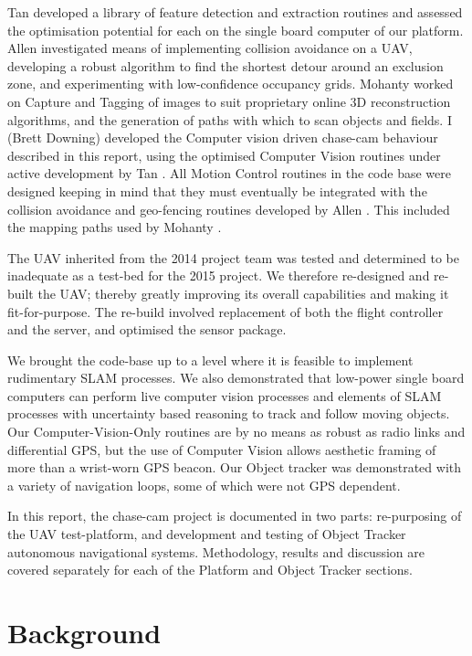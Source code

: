 \documentclass{article}
\begin{document}
    Tan \cite{Tan} developed a library of feature detection and extraction routines and assessed the optimisation potential for each on the single board computer of our platform.
    Allen \cite{Allen} investigated means of implementing collision avoidance on a UAV, developing a robust algorithm to find the shortest detour around an exclusion zone, and experimenting with low-confidence occupancy grids. 
    Mohanty \cite{Mohanty} worked on Capture and Tagging of images to suit proprietary online 3D reconstruction algorithms, and the generation of paths with which to scan objects and fields.
    I (Brett Downing) \cite{Downing} developed the Computer vision driven chase-cam behaviour described in this report, using the optimised Computer Vision routines under active development by Tan \cite{Tan}.
    All Motion Control routines in the code base were designed keeping in mind that they must eventually be integrated with the collision avoidance and geo-fencing routines developed by Allen \cite{Allen}. This included the mapping paths used by Mohanty \cite{Mohanty}.

    The UAV inherited from the 2014 project team was tested and determined to be inadequate as a test-bed for the 2015 project. We therefore re-designed and re-built the UAV; thereby greatly improving its overall capabilities and making it fit-for-purpose. The re-build involved replacement of both the flight controller and the server, and optimised the sensor package. 

    We brought the code-base up to a level where it is feasible to implement rudimentary SLAM processes. We also demonstrated that low-power single board computers can perform live computer vision processes and elements of SLAM processes with uncertainty based reasoning to track and follow moving objects. Our Computer-Vision-Only routines are by no means as robust as radio links and differential GPS, but the use of Computer Vision allows aesthetic framing of more than a wrist-worn GPS beacon. Our Object tracker was demonstrated with a variety of navigation loops, some of which were not GPS dependent.

    In this report, the chase-cam project is documented in two parts: re-purposing of the UAV test-platform, and development and testing of Object Tracker autonomous navigational systems. Methodology, results and discussion are covered separately for each of the Platform and Object Tracker sections.

  \section{Background}
\end{document}
